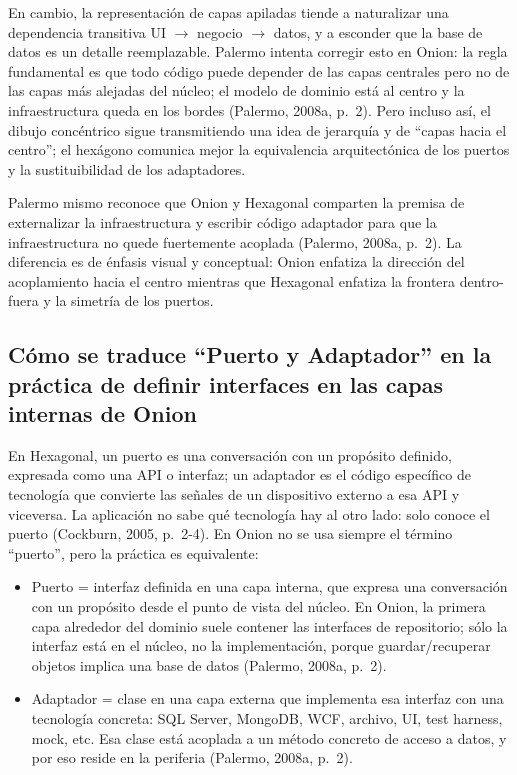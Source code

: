 \documentclass[12pt,a4paper]{article}
\begin{document}
En cambio, la representación de capas apiladas tiende a naturalizar una dependencia transitiva UI $\rightarrow$ negocio $\rightarrow$ datos, y a esconder que la base de datos es un detalle reemplazable. Palermo intenta corregir esto en Onion: la regla fundamental es que todo código puede depender de las capas centrales pero no de las capas más alejadas del núcleo; el modelo de dominio está al centro y la infraestructura queda en los bordes (Palermo, 2008a, p.~2). Pero incluso así, el dibujo concéntrico sigue transmitiendo una idea de jerarquía y de ``capas hacia el centro''; el hexágono comunica mejor la equivalencia arquitectónica de los puertos y la sustituibilidad de los adaptadores.

Palermo mismo reconoce que Onion y Hexagonal comparten la premisa de externalizar la infraestructura y escribir código adaptador para que la infraestructura no quede fuertemente acoplada (Palermo, 2008a, p.~2). La diferencia es de énfasis visual y conceptual: Onion enfatiza la dirección del acoplamiento hacia el centro mientras que Hexagonal enfatiza la frontera dentro-fuera y la simetría de los puertos.

\subsection{Cómo se traduce ``Puerto y Adaptador'' en la práctica de definir interfaces en las capas internas de Onion}

En Hexagonal, un puerto es una conversación con un propósito definido, expresada como una API o interfaz; un adaptador es el código específico de tecnología que convierte las señales de un dispositivo externo a esa API y viceversa. La aplicación no sabe qué tecnología hay al otro lado: solo conoce el puerto (Cockburn, 2005, p.~2-4). En Onion no se usa siempre el término ``puerto'', pero la práctica es equivalente:

\begin{itemize}[label=$\cdot$]
  \item Puerto = interfaz definida en una capa interna, que expresa una conversación con un propósito desde el punto de vista del núcleo. En Onion, la primera capa alrededor del dominio suele contener las interfaces de repositorio; sólo la interfaz está en el núcleo, no la implementación, porque guardar/recuperar objetos implica una base de datos (Palermo, 2008a, p.~2).
  \item Adaptador = clase en una capa externa que implementa esa interfaz con una tecnología concreta: SQL Server, MongoDB, WCF, archivo, UI, test harness, mock, etc. Esa clase está acoplada a un método concreto de acceso a datos, y por eso reside en la periferia (Palermo, 2008a, p.~2).
\end{itemize}
\end{document}
